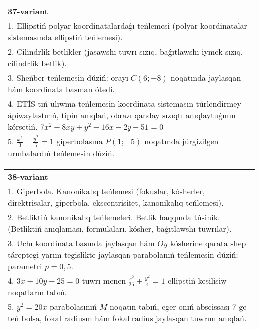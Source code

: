 \documentclass{article}
\begin{document}
\begin{tabular}{m{17cm}}
\textbf{37-variant}\\
1. Ellipstiń polyar koordinatalardaǵı teńlemesi (polyar koordinatalar sistemasında ellipstiń teńlemesi).\\

2. Cilindrlik betlikler (jasawshı tuwrı sızıq, baǵıtlawshı iymek sızıq, cilindrlik betlik).\\

3. Sheńber teńlemesin dúziń: orayı $C (6 ;-8) $ noqatında jaylasqan hám koordinata basınan ótedi.\\

4. ETİS-tıń ulıwma teńlemesin koordinata sistemasın túrlendirmey ápiwaylastırıń, tipin anıqlań, obrazı qanday sızıqtı anıqlaytuǵının kórsetiń. $7x^{2} - 8xy + y^{2} - 16x - 2y - 51 = 0$  \\

5. $\frac{x^{2}}{3} - \frac{y^{2}}{5} = 1$ giperbolasına $P(1; - 5)$ noqatında júrgizilgen urınbalardıń teńlemesin dúziń.
\end{tabular}
\vspace{1cm}


\begin{tabular}{m{17cm}}
\textbf{38-variant}\\
1. Giperbola. Kanonikalıq teńlemesi (fokuslar, kósherler, direktrisalar, giperbola, ekscentrisitet, kanonikalıq teńlemesi).\\

2. Betliktiń kanonikalıq teńlemeleri. Betlik haqqında túsinik. (Betliktiń anıqlaması, formulaları, kósher, baǵıtlawshı tuwrılar).\\

3. Uchı koordinata basında jaylasqan hám $Oy$ kósherine qarata shep táreptegi yarım tegislikte jaylasqan parabolanıń teńlemesin dúziń: parametri $p=0,5$.\\

4. $3x + 10y - 25 = 0$ tuwrı menen $\frac{x^{2}}{25} + \frac{y^{2}}{4} = 1$ ellipstiń kesilisiw noqatların tabıń.\\

5. $y^{2} = 20x$ parabolasınıń $M$ noqatın tabıń, eger onıń abscissası 7 ge teń bolsa, fokal radiusın hám fokal radius jaylasqan tuwrını anıqlań.
\end{tabular}
\vspace{1cm}
\end{document}
